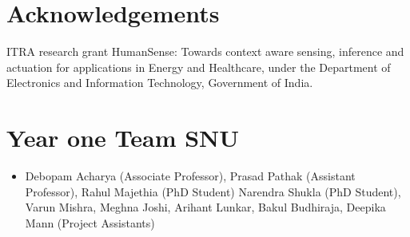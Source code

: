 \documentclass[a0,portrait]{a0poster}
\begin{document}
\begin{multicols}{2}
\section*{Acknowledgements}
\color{DarkSlateGray}
ITRA research grant HumanSense: Towards context aware sensing, inference and actuation for applications in Energy and Healthcare, under the Department of Electronics and Information Technology, Government of India.
\color{SaddleBrown}
\section*{Year one Team SNU}
\color{DarkSlateGray}
\begin{itemize}
\item Debopam Acharya (Associate Professor), Prasad Pathak (Assistant Professor), Rahul Majethia (PhD Student)
Narendra Shukla (PhD Student), Varun Mishra, Meghna Joshi, Arihant Lunkar, Bakul Budhiraja, Deepika Mann (Project Assistants)
\end{itemize}

\end{multicols}
\end{document}
